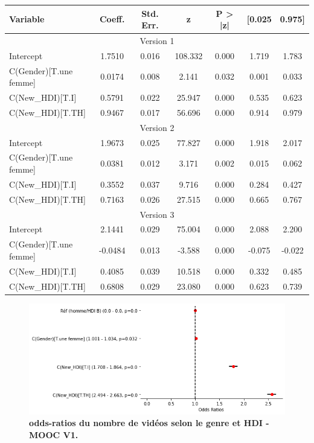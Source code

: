 \documentclass[12pt, a4paper, titlepage, table]{article}
\begin{document}
	\begin{center}
		\begin{tabular}{lcccccc}
		\hline
		Variable & Coeff. & Std. Err. & z & P > |z| & [0.025 & 0.975] \\
		\hline
		\multicolumn{7}{c}{Version 1} \\
		\hline
		Intercept & 1.7510 & 0.016 & 108.332 & 0.000 & 1.719 & 1.783 \\
		C(Gender)[T.une femme] & 0.0174 & 0.008 & 2.141 & 0.032 & 0.001 & 0.033 \\
		C(New\_HDI)[T.I] & 0.5791 & 0.022 & 25.947 & 0.000 & 0.535 & 0.623 \\
		C(New\_HDI)[T.TH] & 0.9467 & 0.017 & 56.696 & 0.000 & 0.914 & 0.979 \\
		\hline
		\multicolumn{7}{c}{Version 2} \\
		\hline
		Intercept & 1.9673 & 0.025 & 77.827 & 0.000 & 1.918 & 2.017 \\
		C(Gender)[T.une femme] & 0.0381 & 0.012 & 3.171 & 0.002 & 0.015 & 0.062 \\
		C(New\_HDI)[T.I] & 0.3552 & 0.037 & 9.716 & 0.000 & 0.284 & 0.427 \\
		C(New\_HDI)[T.TH] & 0.7163 & 0.026 & 27.515 & 0.000 & 0.665 & 0.767 \\
		\hline
		\multicolumn{7}{c}{Version 3} \\
		\hline
		Intercept & 2.1441 & 0.029 & 75.004 & 0.000 & 2.088 & 2.200 \\
		C(Gender)[T.une femme] & -0.0484 & 0.013 & -3.588 & 0.000 & -0.075 & -0.022 \\
		C(New\_HDI)[T.I] & 0.4085 & 0.039 & 10.518 & 0.000 & 0.332 & 0.485 \\
		C(New\_HDI)[T.TH] & 0.6808 & 0.029 & 23.080 & 0.000 & 0.623 & 0.739 \\
		\hline
		\end{tabular}
		\end{center}
\begin{figure}[H]
	\centering
	\includegraphics[width=1\textwidth]{../../graph/forestplot_V0_poisson.png}
	\caption{\textbf{ odds-ratios du nombre de vidéos selon le genre et HDI - MOOC V1.}}
\end{figure}
\end{document}
